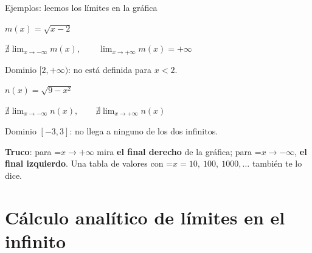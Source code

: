 \documentclass[11pt,a4paper]{article}
\newcommand{\fmm}[1]{\setbox0=\hbox{$#1$}\ifdim\wd0>\linewidth\[#1\]\else\mbox{\box0}\fi}
\newcommand{\fmuline}[1]{\textbf{\color{fmaccent}#1}}
\begin{document}
\begin{fmexfill}{Ejemplos: leemos los límites en la gráfica}
\begin{minipage}[t][\tcbtextheight][s]{\linewidth}
\noindent \begin{minipage}[t]{0.48\linewidth}\centering $m(x)=\sqrt{x-2}$\par\smallskip {}\par\smallskip $\displaystyle\nexists\lim_{x\to-\infty}m(x),\qquad\lim_{x\to+\infty}m(x)=+\infty$\par Dominio $[2,+\infty)$: no está definida para $x<2$.\end{minipage}\hfill\begin{minipage}[t]{0.48\linewidth}\centering $n(x)=\sqrt{9-x^2}$\par\smallskip {}\par\smallskip $\displaystyle\nexists\lim_{x\to-\infty}n(x),\qquad\nexists\lim_{x\to+\infty}n(x)$\par Dominio $[-3,3]$: no llega a ninguno de los dos infinitos.\end{minipage}\par
\vfill

      
\begin{fmnote}\fmuline{Truco}: para \fmm{x\to+\infty} mira \textbf{el final derecho} de la gráfica; para \fmm{x\to-\infty}, \textbf{el final izquierdo}. Una tabla de valores con \fmm{x=10,\ 100,\ 1000,\dots} también te lo dice.\end{fmnote}
\end{minipage}
\end{fmexfill}

  
\section{Cálculo analítico de límites en el infinito}\hypertarget{sec2}{}

  
\end{document}
